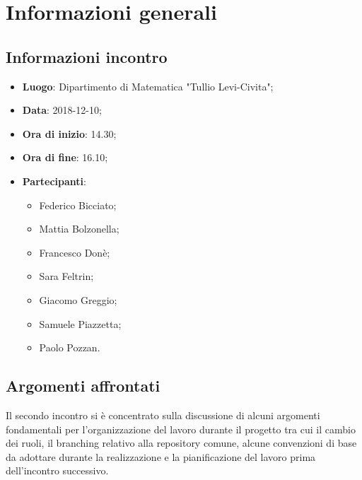 \section{Informazioni generali}

\subsection{Informazioni incontro}
\begin{itemize}
\item \textbf{Luogo}: Dipartimento di Matematica "Tullio Levi-Civita";
\item \textbf{Data}: 2018-12-10;
\item \textbf{Ora di inizio}: 14.30;
\item \textbf{Ora di fine}: 16.10;
\item \textbf{Partecipanti}:
\begin{itemize}
	\item Federico Bicciato;
	\item Mattia Bolzonella;
	\item Francesco Donè;
	\item Sara Feltrin;
	\item Giacomo Greggio;
	\item Samuele Piazzetta;
	\item Paolo Pozzan.
\end{itemize}
\end{itemize}

\subsection{Argomenti affrontati}
Il secondo incontro si è concentrato sulla discussione di alcuni argomenti fondamentali per l'organizzazione del lavoro durante il progetto tra cui il cambio dei ruoli, il branching relativo alla repository comune, alcune convenzioni di base da adottare durante la realizzazione e la pianificazione del lavoro prima dell'incontro successivo.
